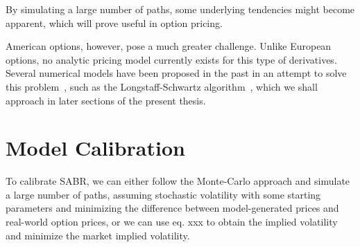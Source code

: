     
By simulating a large number of paths, some underlying tendencies might become apparent, which will prove useful in option pricing.


 American options, however, pose a much greater challenge.  Unlike European options, no analytic pricing model currently exists for this type of derivatives. Several numerical models have been proposed in the past in an attempt to solve this problem~\cite{Wilmott1,Hull}, such as the Longstaff-Schwartz algorithm~\citep{Longstaff}, which we shall approach in later sections of the present thesis.
\fi 
 
\section{Model Calibration}
\label{section:Model Calibration}
To calibrate SABR, we can either follow the Monte-Carlo approach and simulate a large number of paths, assuming stochastic volatility with some starting parameters and minimizing the difference between model-generated prices and real-world option prices, or we can use eq. xxx to obtain the implied volatility and minimize the market implied volatility.
